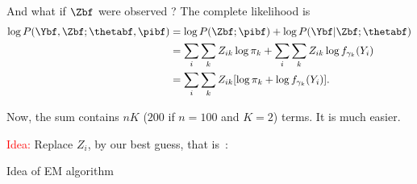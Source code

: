 \begin{frame}{And what if $\Zbf$ were observed  ?}
The complete likelihood is 
\begin{align*}
    \log P(\Ybf, \Zbf; \thetabf, \pibf) &=\log P(\Zbf; \pibf) + \log P(\Ybf\vert \Zbf; \thetabf)\\
      & =  \sum_i \sum_k Z_{ik} \log \pi_k + \sum_i \sum_k Z_{ik} \log
    f_{\gamma_k}(Y_i) \\
    & =  \sum_i \sum_k Z_{ik} [\log \pi_k + \log
      f_{\gamma_k}(Y_i)].
\end{align*}
  
Now, the sum contains $nK$ ($200$ if $n=100$ and $K=2$) terms.  It is much easier.
\pause

\centering{\textcolor{red}{Unfortunately $\Zbf$ are unknown.} }
\pause

\bigskip

\textcolor{red}{Idea:} Replace $Z_i$, by our best guess, that is~:
\end{frame}

\begin{frame}{Idea of EM algorithm}
% 
% 
\end{frame}


